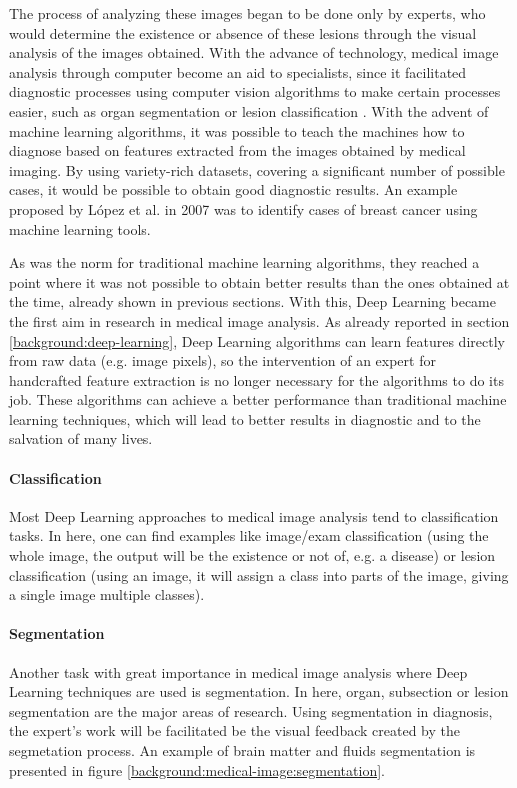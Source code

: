 \documentclass[
  twoside,
  11pt, a4paper,
  footinclude=true,
  headinclude=true,
  cleardoublepage=empty
]{scrbook}
\begin{document}
      The process of analyzing these images began to be done only by experts, who would determine the existence or absence of these lesions through the visual analysis of the images obtained. With the advance of technology, medical image analysis through computer become an aid to specialists, since it facilitated diagnostic processes using computer vision algorithms to make certain processes easier, such as organ segmentation \cite{karssemeijer1988recognition, punia2013review} or lesion classification \cite{wolberg1994machine} . With the advent of machine learning algorithms, it was possible to teach the machines how to diagnose based on features extracted from the images obtained by medical imaging. By using variety-rich datasets, covering a significant number of possible cases, it would be possible to obtain good diagnostic results. An example proposed by López et al. in 2007 \cite{lopez2007breast} was to identify cases of breast cancer using machine learning tools.

      As was the norm for traditional machine learning algorithms, they reached a point where it was not possible to obtain better results than the ones obtained at the time, already shown in previous sections. With this, Deep Learning became the first aim in research in medical image analysis. As already reported in section \ref{background:deep-learning}, Deep Learning algorithms can learn features directly from raw data (e.g. image pixels), so the intervention of an expert for handcrafted feature extraction is no longer necessary for the algorithms to do its job. These algorithms can achieve a better performance than traditional machine learning techniques, which will lead to better results in diagnostic and to the salvation of many lives.

      \paragraph{Classification}
        Most Deep Learning approaches to medical image analysis tend to classification tasks. In here, one can find examples like image/exam classification (using the whole image, the output will be the existence or not of, e.g. a disease) or lesion classification (using an image, it will assign a class into parts of the image, giving a single image multiple classes).

      \paragraph{Segmentation}
        Another task with great importance in medical image analysis where Deep Learning techniques are used is segmentation. In here, organ, subsection or lesion segmentation are the major areas of research. Using segmentation in diagnosis, the expert's work will be facilitated be the visual feedback created by the segmetation process. An example of brain matter and fluids segmentation is presented in figure \ref{background:medical-image:segmentation}.
\end{document}
